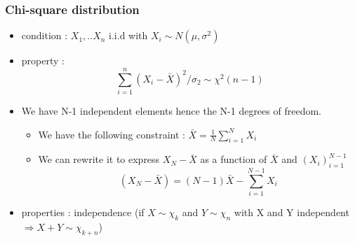 \documentclass{article}
\begin{document}
\subsubsection{Chi-square distribution}
\begin{itemize}
    \item condition : $X_1, ..X_n$ i.i.d with $X_i\sim N(\mu,\sigma^2)$
    \item property : 
\begin{equation}
    \sum_{i=1}^n(X_i-\bar{X})^2/\sigma_2 \sim \chi^2(n-1)
\end{equation}
    \item We have N-1 independent elements hence the N-1 degrees of freedom. 
\begin{proofbox}
\begin{itemize}
    \item We have the following constraint : $\bar{X}=\frac{1}{N}\sum_{i=1}^NX_i$
    \item We can rewrite it to express $X_N-\bar{X}$ as a function of $\bar{X}$ and $(X_i)_{i=1}^{N-1}$
\begin{equation}
    (X_N-\bar{X}) = (N-1)\bar{X}-\sum_{i=1}^{N-1}X_i
\end{equation}
\end{itemize}   
\end{proofbox}
    \item properties : independence (if $X\sim \chi_k$ and $Y\sim \chi_n$ with X and Y independent $\Longrightarrow X+Y\sim\chi_{k+n}$)
\end{itemize}
\end{document}
